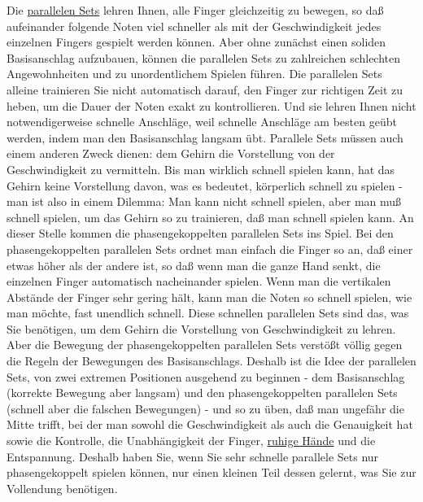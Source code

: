 Die \hyperlink{c1ii11}{parallelen Sets} lehren Ihnen, alle Finger gleichzeitig zu bewegen, so daß aufeinander folgende Noten viel schneller als mit der Geschwindigkeit jedes einzelnen Fingers gespielt werden können.
Aber ohne zunächst einen soliden Basisanschlag aufzubauen, können die parallelen Sets zu zahlreichen schlechten Angewohnheiten und zu unordentlichem Spielen führen.
Die parallelen Sets alleine trainieren Sie nicht automatisch darauf, den Finger zur richtigen Zeit zu heben, um die Dauer der Noten exakt zu kontrollieren.
Und sie lehren Ihnen nicht notwendigerweise schnelle Anschläge, weil schnelle Anschläge am besten geübt werden, indem man den Basisanschlag langsam übt.
Parallele Sets müssen auch einem anderen Zweck dienen: dem Gehirn die Vorstellung von der Geschwindigkeit zu vermitteln.
Bis man wirklich schnell spielen kann, hat das Gehirn keine Vorstellung davon, was es bedeutet, körperlich schnell zu spielen - man ist also in einem Dilemma: Man kann nicht schnell spielen, aber man muß schnell spielen, um das Gehirn so zu trainieren, daß man schnell spielen kann.
An dieser Stelle kommen die phasengekoppelten parallelen Sets ins Spiel.
Bei den phasengekoppelten parallelen Sets ordnet man einfach die Finger so an, daß einer etwas höher als der andere ist, so daß wenn man die ganze Hand senkt, die einzelnen Finger automatisch nacheinander spielen.
Wenn man die vertikalen Abstände der Finger sehr gering hält, kann man die Noten so schnell spielen, wie man möchte, fast unendlich schnell.
Diese schnellen parallelen Sets sind das, was Sie benötigen, um dem Gehirn die Vorstellung von Geschwindigkeit zu lehren.
Aber die Bewegung der phasengekoppelten parallelen Sets verstößt völlig gegen die Regeln der Bewegungen des Basisanschlags.
Deshalb ist die Idee der parallelen Sets, von zwei extremen Positionen ausgehend zu beginnen - dem Basisanschlag (korrekte Bewegung aber langsam) und den phasengekoppelten parallelen Sets (schnell aber die falschen Bewegungen) - und so zu üben, daß man ungefähr die Mitte trifft, bei der man sowohl die Geschwindigkeit als auch die Genauigkeit hat sowie die Kontrolle, die Unabhängigkeit der Finger, \hyperlink{ruhig}{ruhige Hände} und die Entspannung.
Deshalb haben Sie, wenn Sie sehr schnelle parallele Sets nur phasengekoppelt spielen können, nur einen kleinen Teil dessen gelernt, was Sie zur Vollendung benötigen.

